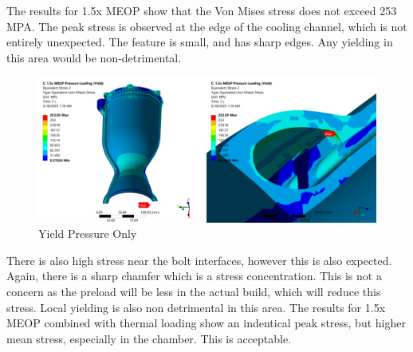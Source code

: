 The results for 1.5x MEOP show that the Von Mises stress does not exceed 253 MPA. The peak stress is observed at the edge of the cooling channel, which is not entirely unexpected. The feature is small, and has sharp edges. Any yielding in this area would be non-detrimental. 
\begin{figure}
    \centering
    \includegraphics[width=1\linewidth]{Images/Yield Pressure Loading Only.png}
    \caption{Yield Pressure Only}
    \label{fig:Yield Pressure Only}
\end{figure}
There is also high stress near the bolt interfaces, however this is also expected. Again, there is a sharp chamfer which is a stress concentration. This is not a concern as the preload will be less in the actual build, which will reduce this stress. Local yielding is also non detrimental in this area. 
The results for 1.5x MEOP combined with thermal loading show an indentical peak stress, but higher mean stress, especially in the chamber. This is acceptable. 

